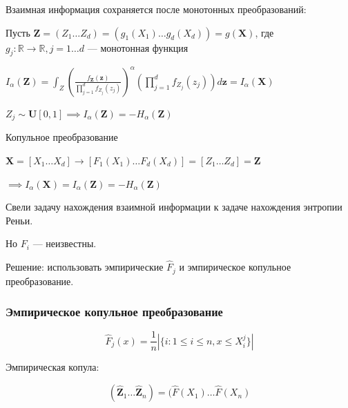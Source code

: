 \documentclass[14pt]{beamer}
\begin{document}
\begin{frame}
    Взаимная информация сохраняется после монотонных преобразований:

    Пусть $ \mathbf Z = (Z_1 \dots Z_d) = (g_1(X_1) \dots g_d(X_d)) = g(\mathbf X)  $, где 
    $ g_j : \mathbb R \to \mathbb R, j = 1 \dots d $ — монотонная функция


    $I_\alpha(\mathbf Z) = \int_{Z} \left ( \frac{f_{\mathbf Z}(\mathbf z)}{\prod_{j=1}^d f_{Z_j}(z_j)} \right )^\alpha
    \left ( \prod\limits_{j=1}^d f_{Z_j}(z_j) \right ) d {\mathbf z} = I_\alpha (\mathbf X)
    $
    
    $ Z_j \sim \mathbf U[0,1] \implies I_\alpha (\mathbf Z) = -H_\alpha (\mathbf Z) $
\end{frame}

\begin{frame}
Копульное преобразование

$\mathbf X = [X_1 \dots X_d] \to [F_1(X_1) \dots F_d(X_d)] = [Z_1 \dots Z_d] = \mathbf Z$

$\implies I_\alpha (\mathbf X) = I_\alpha (\mathbf Z) = -H_\alpha (\mathbf Z) $

Свели задачу нахождения взаимной информации к задаче нахождения энтропии Реньи.

Но $F_i$ — неизвестны.

\pause

Решение: использовать эмпирические $\widehat F_j $ и эмпирическое копульное
преобразование.
\end{frame}
\begin{frame}
    \frametitle{Эмпирическое копульное преобразование}
    $$ \widehat F_j(x) = \frac{1}{n} | \{i : 1 \le i \le n, x \le X^j_i \} | $$

    Эмпирическая копула:

    $$ (\widehat{\mathbf Z}_1\dots \widehat{ \mathbf Z}_n) = (\widehat F(X_1) \dots \widehat F(X_n) $$


\end{frame}
\end{document}
